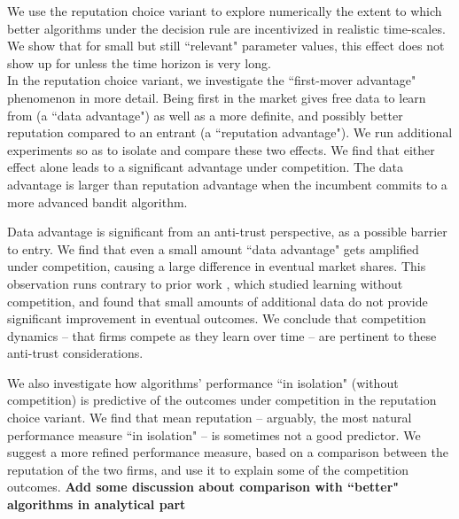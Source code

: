 We use the reputation choice variant to explore numerically the extent to which better algorithms under the \HardMaxRandom decision rule are incentivized in realistic time-scales. We show that for small but still ``relevant" parameter values, this effect does not show up for unless the time horizon is very long. \\
In the reputation choice variant, we investigate the ``first-mover advantage" phenomenon in more detail. Being first in the market gives free data to learn from (a ``data advantage") as well as a more definite, and possibly better reputation compared to an entrant (a ``reputation advantage"). We run additional experiments so as to isolate and compare these two effects. We find that either effect alone leads to a significant advantage under competition. The data advantage is larger than reputation advantage when the incumbent commits to a more advanced bandit algorithm.

Data advantage is significant from an anti-trust perspective, as a possible barrier to entry. We find that even a small amount ``data advantage" gets amplified under competition, causing a large difference in eventual market shares. This observation runs contrary to prior work  \cite{lambrecht2015can,bajari2018impact}, which studied learning without competition, and found that small amounts of additional data do not provide significant improvement in eventual outcomes. We conclude that competition dynamics -- that firms compete as they learn over time -- are pertinent to these anti-trust considerations.

 We also investigate how algorithms' performance ``in isolation" (without competition) is predictive of the outcomes under competition in the reputation choice variant. We find that mean reputation -- arguably, the most natural performance measure ``in isolation" -- is sometimes not a good predictor. We suggest a more refined performance measure, based on a comparison between the reputation of the two firms, and use it to explain some of the competition outcomes.
\textbf{Add some discussion about comparison with ``better" algorithms in analytical part}

